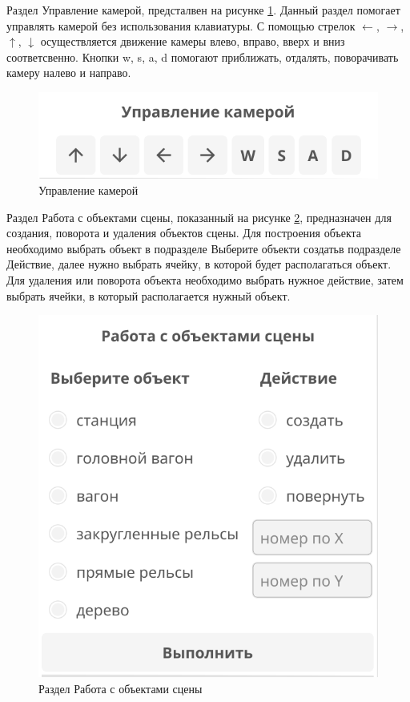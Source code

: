 Раздел \guillemotleft Управление камерой\guillemotright, предсталвен на рисунке \ref{img:camera}. Данный раздел помогает управлять 
камерой без использования клавиатуры. С помощью стрелок \(\leftarrow\), \(\rightarrow\), \(\uparrow\), \(\downarrow\) осуществляется движение
камеры влево, вправо, вверх и вниз соответсвенно. Кнопки w, s, a, d помогают приближать, отдалять, поворачивать камеру налево и направо.

\begin{figure}[h]
    \centering
    \includegraphics[width=0.8\linewidth]{img/camera.png}
    \caption{\guillemotleft Управление камерой\guillemotright}
    \label{img:camera}
\end{figure}
\noindent

Раздел \guillemotleft Работа с объектами сцены\guillemotright, показанный на рисунке \ref{img:create}, предназначен для создания, поворота и удаления объектов сцены.
Для построения объекта необходимо выбрать объект в подразделе \guillemotleft Выберите объект\guillemotright и 
\guillemotleft создать\guillemotright в подразделе \guillemotleft Действие\guillemotright, далее нужно выбрать ячейку, в которой будет
располагаться объект. Для удаления или поворота объекта необходимо выбрать нужное действие, затем выбрать ячейки, в который располагается
нужный объект.

\clearpage
\begin{figure}[h]
    \centering
    \includegraphics[width=0.65\linewidth]{img/create.png}
    \caption{Раздел \guillemotleft Работа с объектами сцены\guillemotright}
    \label{img:create}
\end{figure}
\noindent

